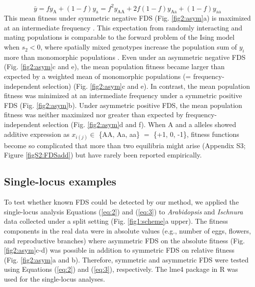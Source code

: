 \documentclass[12pt,]{article}
\begin{document}
\begin{equation}
\bar{y} = f y_\mathrm{A} + (1-f)y_\mathrm{a} = f^2 y_\mathrm{AA} + 2f (1-f)y_\mathrm{Aa} + (1-f)y_\mathrm{aa} \label{eq:6}
\end{equation}
\noindent
This mean fitness under symmetric negative FDS (Fig. \ref{fig2:asym}a) is maximized at an intermediate frequency \citep{schneider_maximization_2008}. This expectation from randomly interacting and mating populations is comparable to the forward problem of the Ising model when $s_2<0$, where spatially mixed genotypes increase the population sum of $y_i$ more than monomorphic populations \citep{sato2019neighbor}. Even under an asymmetric negative FDS (Fig. \ref{fig2:asym}c and e), the mean population fitness became larger than expected by a weighted mean of monomorphic populations (= frequency-independent selection) \citep{takahashi2018balanced} (Fig. \ref{fig2:asym}c and e). In contrast, the mean population fitness was minimized at an intermediate frequency under a symmetric positive FDS (Fig. \ref{fig2:asym}b). Under asymmetric positive FDS, the mean population fitness was neither maximized nor greater than expected by frequency-independent selection \citep{schneider_maximization_2008, takahashi2018balanced} (Fig. \ref{fig2:asym}d and f). When A and a alleles showed additive expression as $x_{i(j)} \in$ \{AA, Aa, aa\} $=$ \{+1, 0, -1\}, fitness functions become so complicated that more than two equilibria might arise (Appendix S3; Figure \ref{figS2:FDSadd}) but have rarely been reported empirically. 


\subsection{Single-locus examples}
To test whether known FDS could be detected by our method, we applied the single-locus analysis Equations (\ref{eq:2}) and (\ref{eq:3}) to \textit{Arabidopsis} and \textit{Ischnura} data \citep{sato2017herbivore, takahashi2014evolution} collected under a split setting (Fig. \ref{fig1:scheme}a upper). The fitness components in the real data were in absolute values (e.g., number of eggs, flowers, and reproductive branches) where asymmetric FDS on the absolute fitness (Fig. \ref{fig2:asym}c-d) was possible in addition to symmetric FDS on relative fitness (Fig. \ref{fig2:asym}a and b). Therefore, symmetric and asymmetric FDS were tested using Equations (\ref{eq:2}) and (\ref{eq:3}), respectively. The lme4 package \citep{bates2015} in R was used for the single-locus analyses.
\end{document}
